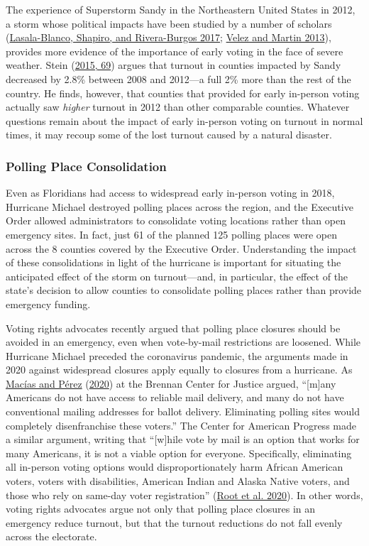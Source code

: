 \documentclass[
  12pt,
]{article}
\begin{document}
The experience of Superstorm Sandy in the Northeastern United States in 2012, a storm whose political impacts have been studied by a number of scholars (\protect\hyperlink{ref-Lasala-Blanco2017}{Lasala-Blanco, Shapiro, and Rivera-Burgos 2017}; \protect\hyperlink{ref-Velez2013}{Velez and Martin 2013}), provides more evidence of the importance of early voting in the face of severe weather. Stein (\protect\hyperlink{ref-Stein2015}{2015, 69}) argues that turnout in counties impacted by Sandy decreased by 2.8\% between 2008 and 2012---a full 2\% more than the rest of the country. He finds, however, that counties that provided for early in-person voting actually saw \emph{higher} turnout in 2012 than other comparable counties. Whatever questions remain about the impact of early in-person voting on turnout in normal times, it may recoup some of the lost turnout caused by a natural disaster.

\hypertarget{polling-place-consolidation}{%
\subsubsection*{Polling Place Consolidation}\label{polling-place-consolidation}}

Even as Floridians had access to widespread early in-person voting in 2018, Hurricane Michael destroyed polling places across the region, and the Executive Order allowed administrators to consolidate voting locations rather than open emergency sites. In fact, just 61 of the planned 125 polling places were open across the 8 counties covered by the Executive Order. Understanding the impact of these consolidations in light of the hurricane is important for situating the anticipated effect of the storm on turnout---and, in particular, the effect of the state's decision to allow counties to consolidate polling places rather than provide emergency funding.

Voting rights advocates recently argued that polling place closures should be avoided in an emergency, even when vote-by-mail restrictions are loosened. While Hurricane Michael preceded the coronavirus pandemic, the arguments made in 2020 against widespread closures apply equally to closures from a hurricane. As \protect\hyperlink{ref-Macias2020}{Macías and Pérez} (\protect\hyperlink{ref-Macias2020}{2020}) at the Brennan Center for Justice argued, ``{[}m{]}any Americans do not have access to reliable mail delivery, and many do not have conventional mailing addresses for ballot delivery. Eliminating polling sites would completely disenfranchise these voters.'' The Center for American Progress made a similar argument, writing that ``{[}w{]}hile vote by mail is an option that works for many Americans, it is not a viable option for everyone. Specifically, eliminating all in-person voting options would disproportionately harm African American voters, voters with disabilities, American Indian and Alaska Native voters, and those who rely on same-day voter registration'' (\protect\hyperlink{ref-Root2020}{Root et al. 2020}). In other words, voting rights advocates argue not only that polling place closures in an emergency reduce turnout, but that the turnout reductions do not fall evenly across the electorate.
\end{document}
